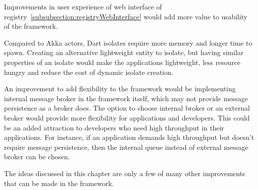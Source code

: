   Improvements in user experience of web interface of registry~\autoref{subsubsection:registryWebInterface} would add more value to usability of the framework.

  Compared to Akka actors, Dart isolates require more memory and longer time to spawn. Creating an alternative lightweight entity to isolate, but having similar properties of an isolate would make the applications lightweight, less resource hungry and reduce the cost of dynamic isolate creation.

  An improvement to add flexibility to the framework would be implementing internal message broker in the framework itself, which may not provide message persistence as a broker does. The option to choose internal broker or an external broker would provide more flexibility for applications and developers. This could be an added attraction to developers who need high throughput in their applications. For instance, if an application demands high throughput but doesn't require message persistence, then the internal queue instead of external message broker can be chosen.

  The ideas discussed in this chapter are only a few of many other improvements that can be made in the framework.
